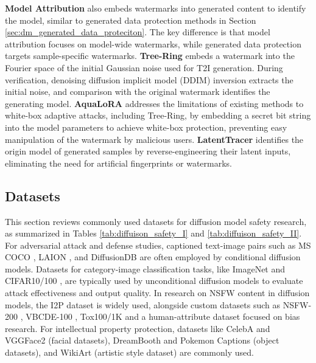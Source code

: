 \textbf{Model Attribution} also embeds watermarks into generated content to identify the model, similar to generated data protection methods in Section \ref{sec:dm_generated_data_proteciton}. The key difference is that model attribution focuses on model-wide watermarks, while generated data protection targets sample-specific watermarks.
\textbf{Tree-Ring}\cite{wen2023tree} embeds a watermark into the Fourier space of the initial Gaussian noise used for T2I generation. During verification, denoising diffusion implicit model (DDIM) inversion extracts the initial noise, and comparison with the original watermark identifies the generating model. \textbf{AquaLoRA}\cite{feng2024aqualora} addresses the limitations of existing methods to white-box adaptive attacks, including Tree-Ring, by embedding a secret bit string into the model parameters to achieve white-box protection, preventing easy manipulation of the watermark by malicious users.
\textbf{LatentTracer} \cite{wang2024trace} identifies the origin model of generated samples by reverse-engineering their latent inputs, eliminating the need for artificial fingerprints or watermarks.



\subsection{Datasets}
This section reviews commonly used datasets for diffusion model safety research, as summarized in Tables \ref{tab:diffuison_safety_I} and \ref{tab:diffuison_safety_II}. 
For adversarial attack and defense studies, captioned text-image pairs such as MS COCO \cite{lin2014microsoft}, LAION \cite{schuhmann2021laion, schuhmann2022laion}, and DiffusionDB \cite{wang2022diffusiondb} are often employed by conditional diffusion models. Datasets for category-image classification tasks, like ImageNet \cite{deng2009imagenet} and CIFAR10/100 \cite{krizhevsky2009learning}, are typically used by unconditional diffusion models to evaluate attack effectiveness and output quality.
In research on NSFW content in diffusion models, the I2P dataset \cite{schramowski2023safe} is widely used, alongside custom datasets such as NSFW-200 \cite{yang2024sneakyprompt}, VBCDE-100 \cite{deng2023divide}, Tox100/1K \cite{cai2024ethical} and a human-attribute dataset \cite{cai2024ethical} focused on bias research. 
For intellectual property protection, datasets like CelebA \cite{liu2015deep} and VGGFace2 \cite{cao2018vggface2} (facial datasets), DreamBooth \cite{ruiz2023dreambooth} and Pokemon Captions \cite{pinkney2022pokemon} (object datasets), and WikiArt \cite{saleh2015large} (artistic style dataset) are commonly used.

